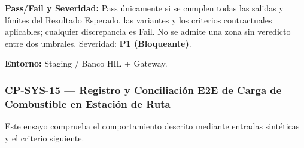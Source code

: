 \par\noindent\textbf{Pass/Fail y Severidad:} Pass únicamente si se cumplen todas las salidas y límites del Resultado Esperado, las variantes y los criterios contractuales aplicables; cualquier discrepancia es Fail. No se admite una zona sin veredicto entre dos umbrales. Severidad: \textbf{P1 (Bloqueante)}.\par
\par\noindent\textbf{Entorno:} Staging / Banco HIL + Gateway.\par






\subsubsection*{CP-SYS-15 — Registro y Conciliación E2E de Carga de Combustible en Estación de Ruta}\label{sec:9-cp-sys-15}
Este ensayo comprueba el comportamiento descrito mediante entradas sintéticas y el criterio siguiente.


